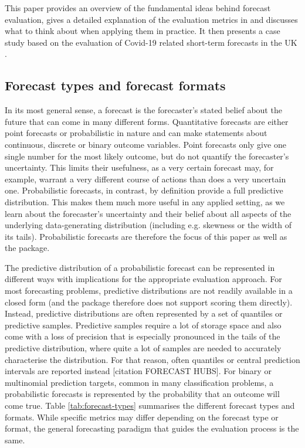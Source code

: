 \documentclass[article,shortnames]{jss}\usepackage[]{graphicx}\usepackage[]{color}
\begin{document}
This paper provides an overview of the fundamental ideas behind forecast evaluation, gives a detailed explanation of the evaluation metrics in  and discusses what to think about when applying them in practice. It then presents a case study based on the evaluation of Covid-19 related short-term forecasts in the UK \citep{funkShorttermForecastsInform2020}. 
\subsection{Forecast types and forecast formats}

In its most general sense, a forecast is the forecaster’s stated belief about the future \citep{gneitingStrictlyProperScoring2007} that can come in many different forms. Quantitative forecasts are either point forecasts or probabilistic in nature and can make statements about continuous, discrete or binary outcome variables. Point forecasts only give one single number for the most likely outcome, but do not quantify the forecaster's uncertainty. This limits their usefulness, as a very certain forecast may, for example, warrant a very different course of actions than does a very uncertain one. Probabilistic forecasts, in contrast, by definition provide a full predictive distribution. This makes them much more useful in any applied setting, as we learn about the forecaster's uncertainty and their belief about all aspects of the underlying data-generating distribution (including e.g. skewness or the width of its tails). Probabilistic forecasts are therefore the focus of this paper as well as the  package. 

The predictive distribution of a probabilistic forecast can be represented in different ways with implications for the appropriate evaluation approach. For most forecasting problems, predictive distributions are not readily available in a closed form (and the  package therefore does not support scoring them directly). Instead, predictive distributions are often represented by a set of quantiles or predictive samples. Predictive samples require a lot of storage space and also come with a loss of precision that is especially pronounced in the tails of the predictive distribution, where quite a lot of samples are needed to accurately characterise the distribution. For that reason, often quantiles or central prediction intervals are reported instead [citation FORECAST HUBS]. For binary or multinomial prediction targets, common in many classification problems, a probabilistic forecasts is represented by the probability that an outcome will come true. Table \ref{tab:forecast-types} summarises the different forecast types and formats. While specific metrics may differ depending on the forecast type or format, the general forecasting paradigm \cite{gneitingProbabilisticForecastsCalibration2007} that guides the evaluation process is the same.
\end{document}
